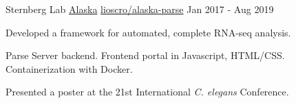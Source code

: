 \begin{cventries}
\cventry
  {Sternberg Lab}
  {\href{https://github.com/Lioscro/alaska-parse}{Alaska}}
  {\faGithub\phantom{a}\href{https://github.com/Lioscro/alaska-parse}{lioscro/alaska-parse}}
  {Jan 2017 - Aug 2019}
  {
   \begin{cvitems} %
     \item Developed a framework for automated, complete RNA-seq analysis.
     \item Parse Server backend. Frontend portal in Javascript, HTML/CSS. Containerization with Docker.
     \item Presented a poster at the 21st International \textit{C. elegans} Conference.
    \end{cvitems}
  }

\end{cventries}
